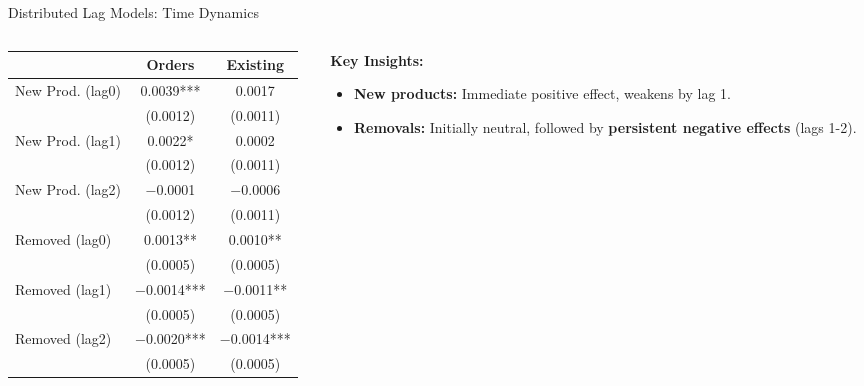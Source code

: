 \documentclass[aspectratio=169]{beamer}  %
\begin{document}
\begin{frame}{Distributed Lag Models: Time Dynamics}
    \begin{columns}[T]
        \begin{column}{0.55\textwidth}
            \begin{table}
            \centering
            \scriptsize
            \begin{tabular}{lcc}
            \toprule
             & \textbf{Orders} & \textbf{Existing} \\
            \midrule
            New Prod. (lag0) & 0.0039*** & 0.0017 \\
             & (0.0012) & (0.0011) \\
            New Prod. (lag1) & 0.0022* & 0.0002 \\
             & (0.0012) & (0.0011) \\
            New Prod. (lag2) & $-$0.0001 & $-$0.0006 \\
             & (0.0012) & (0.0011) \\
            \midrule
            Removed (lag0) & 0.0013** & 0.0010** \\
             & (0.0005) & (0.0005) \\
            Removed (lag1) & $-$0.0014*** & $-$0.0011** \\
             & (0.0005) & (0.0005) \\
            Removed (lag2) & $-$0.0020*** & $-$0.0014*** \\
             & (0.0005) & (0.0005) \\
            \bottomrule
            \end{tabular}
            \end{table}
        \end{column}
        
        \begin{column}{0.44\textwidth}
            \vspace{0.5cm}
            \textbf{Key Insights:}
            \begin{itemize}
                \item \textbf{New products:} Immediate positive effect, weakens by lag 1.
                \item \textbf{Removals:} Initially neutral, followed by \textbf{persistent negative effects} (lags 1-2).
            \end{itemize}
        \end{column}
    \end{columns}
\end{frame}
\end{document}
